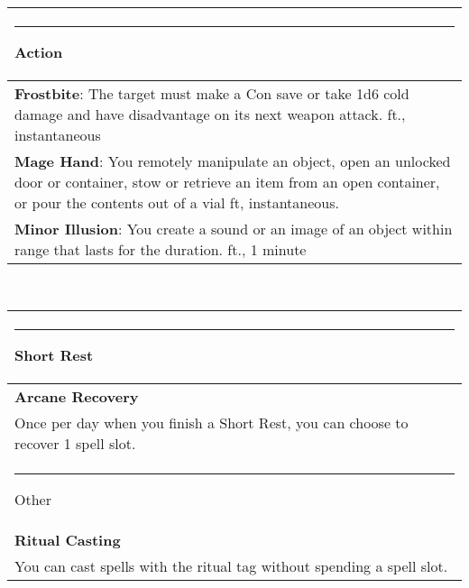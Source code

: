 \documentclass[twocolumn]{article}
\begin{document}
\\
\noindent\begin{tabular}{|m{3.1in}|}
\hline
\rule{1.25in}{0pt}Action\\
\hline
\textbf{Frostbite}: The target must make a Con save or take 1d6 cold damage and have disadvantage on its next weapon attack.  {\sc 60 ft., instantaneous}\\
\hline
\textbf{Mage Hand}: 
You remotely manipulate an object, open an unlocked door or container, stow or retrieve an item from an open container, or pour the contents out of a vial
{\sc 30 ft, instantaneous.}\\
\hline
\textbf{Minor Illusion}: You create a sound or an image of an object within range that lasts for the duration. {\sc 30 ft., 1 minute}\\
\hline
\end{tabular}
\vspace{8pt}

\\
\noindent\begin{tabular}{|m{3.1in}|}
\hline
\rule{1.1in}{0pt}Short Rest\\
\hline
\textbf{Arcane Recovery}\\
Once per day when you finish a Short Rest, you can choose to recover 1 spell slot.\\
\hline
\rule{1.3in}{0pt}Other\\
\hline
\textbf{Ritual Casting}\\
You can cast spells with the {\sc ritual} tag without spending a spell slot. \\
\hline
\end{tabular}
\end{document}

